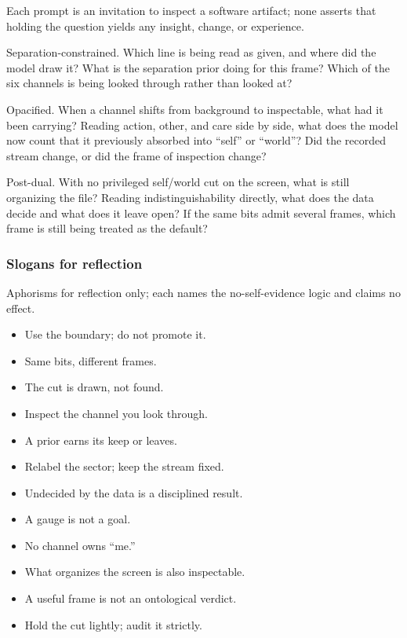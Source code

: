 \documentclass[
]{article}
\newcounter{none} %
\providecommand{\tightlist}{%
  \setlength{\itemsep}{0pt}\setlength{\parskip}{0pt}}
\begin{document}
Each prompt is an invitation to inspect a software artifact; none
asserts that holding the question yields any insight, change, or
experience.

Separation-constrained. Which line is being read as given, and where did
the model draw it? What is the separation prior doing for this frame?
Which of the six channels is being looked through rather than looked at?

Opacified. When a channel shifts from background to inspectable, what
had it been carrying? Reading action, other, and care side by side, what
does the model now count that it previously absorbed into ``self'' or
``world''? Did the recorded stream change, or did the frame of
inspection change?

Post-dual. With no privileged self/world cut on the screen, what is
still organizing the file? Reading indistinguishability directly, what
does the data decide and what does it leave open? If the same bits admit
several frames, which frame is still being treated as the default?

\subsubsection{Slogans for reflection}\label{slogans-for-reflection}

Aphorisms for reflection only; each names the no-self-evidence logic and
claims no effect.

\begin{itemize}
\tightlist
\item
  Use the boundary; do not promote it.
\item
  Same bits, different frames.
\item
  The cut is drawn, not found.
\item
  Inspect the channel you look through.
\item
  A prior earns its keep or leaves.
\item
  Relabel the sector; keep the stream fixed.
\item
  Undecided by the data is a disciplined result.
\item
  A gauge is not a goal.
\item
  No channel owns ``me.''
\item
  What organizes the screen is also inspectable.
\item
  A useful frame is not an ontological verdict.
\item
  Hold the cut lightly; audit it strictly.
\end{itemize}
\end{document}
